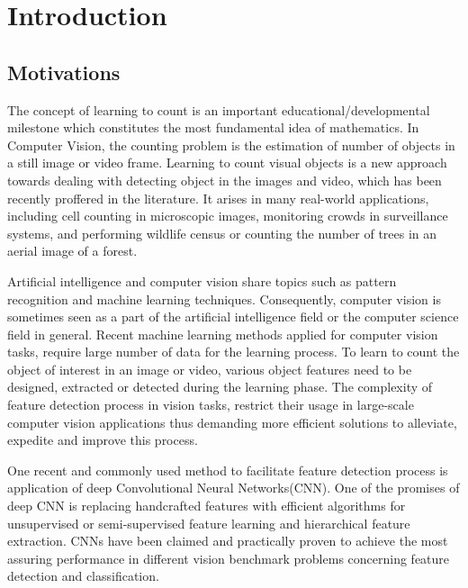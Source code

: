 \chapter{Introduction}
\label{sec:introduction}
\section{Motivations}
The concept of learning to count is an important educational/developmental milestone  which constitutes the most fundamental idea of mathematics. In Computer Vision\cite{umbaugh1997computer}, the counting problem is the estimation of number of objects in a still image or video frame. Learning to count visual objects is a new approach towards dealing with detecting object in the images and video, which has been recently proffered in the literature\cite{viola2005detecting, rabaud2006counting, kong2005counting, chan2008privacy, segui2015learning}. It arises in many real-world applications, including cell counting in microscopic images\cite{flaccavento2011learning}, monitoring crowds in surveillance systems\cite{rahmalan2006crowd, valera2005intelligent}, and performing wildlife census or counting the number of trees in an aerial image of a forest\cite{brandtberg1998automated, pollock1996automatic}\cite{NIPS2010_4043}. 

Artificial intelligence and computer vision share topics such as pattern recognition and machine learning\cite{michalski2013machine, mitchell1997machine} techniques. Consequently, computer vision is sometimes seen as a part of the artificial intelligence field or the computer science field in general. Recent machine learning methods applied for computer vision tasks, require large number of data for the learning process. To learn to count the object of interest in an image or video, various object features need to be designed, extracted or detected during the learning phase. The complexity of feature detection process in vision tasks, restrict their usage in large-scale computer vision applications thus demanding more efficient solutions to alleviate, expedite and improve this process. 

\indent One recent and commonly used method to facilitate feature detection process is application of deep Convolutional Neural Networks(CNN)\cite{szegedy2015going, krizhevsky2012imagenet, lecun1995convolutional, sermanet2013overfeat, ji20133d, taylor2010convolutional}. One of the promises of deep CNN is replacing handcrafted features with efficient algorithms for unsupervised or semi-supervised feature learning and hierarchical feature extraction\cite{song2013hierarchical}. CNNs have been claimed and practically proven to achieve the most assuring performance in different vision benchmark problems concerning feature detection and classification\cite{ciresan2011flexible, szegedy2015going, ciresan2012multi}. 

